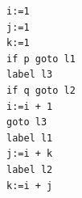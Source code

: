 \documentclass{jarticle}
\begin{document}
\begin{Verbatim}
i:=1
j:=1
k:=1
if p goto l1
label l3
if q goto l2
i:=i + 1
goto l3
label l1
j:=i + k
label l2
k:=i + j
\end{Verbatim}
\end{document}
